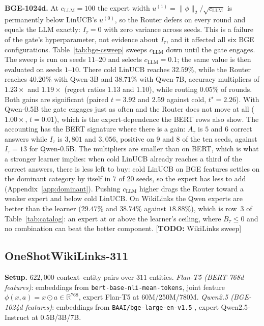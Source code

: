 \documentclass{article}
\theoremstyle{definition}
\theoremstyle{remark}
\theoremstyle{remark}
\newcommand{\todo}[1]{\textcolor{red!70!black}{[\textbf{TODO:} #1]}}
\begin{document}
\textbf{BGE-1024d.} At $c_{\mathrm{LLM}}=100$ the expert width $u^{(1)}=\|\phi\|_2/\sqrt{c_{\mathrm{LLM}}}$
is permanently below LinUCB's $u^{(0)}$, so the Router defers on every round
and equals the LLM exactly: $I_\tau=0$ with zero variance across seeds. This
is a failure of the gate's hyperparameter, not evidence about $I_\tau$, and it
affected all six BGE configurations. Table~\ref{tab:bge-csweep} sweeps $c_{\mathrm{LLM}}$
down until the gate engages. The sweep is run on seeds $11$--$20$ and selects
$c_{\mathrm{LLM}}=0.1$; the same value is then evaluated on seeds $1$--$10$. There cold LinUCB
reaches $32.59\%$, while the Router reaches $40.20\%$ with Qwen-3B and
$38.71\%$ with Qwen-7B, accuracy multipliers of $1.23\times$ and $1.19\times$
(regret ratios $1.13$ and $1.10$), while routing $0.05\%$ of rounds. Both gains
are significant (paired $t=3.92$ and $2.59$ against cold, $t^\star=2.26$). With
Qwen-0.5B the gate engages just as often and the Router does not move at all
($1.00\times$, $t=0.01$), which is the expert-dependence the BERT rows also
show. The accounting has the BERT signature where there is a gain: $A_\tau$ is
$5$ and $6$ correct answers while $I_\tau$ is $3{,}801$ and $3{,}056$, positive
on $9$ and $8$ of the ten seeds, against $I_\tau=13$ for Qwen-0.5B. The
multipliers are smaller than on BERT, which is what a stronger learner implies:
when cold LinUCB already reaches a third of the correct answers, there is less
left to buy: cold LinUCB on BGE features settles on the dominant category
by itself in $7$ of $20$ seeds, so the expert has less to add
(Appendix~\ref{app:dominant}). Pushing $c_{\mathrm{LLM}}$ higher
drags the Router toward a weaker expert and below cold LinUCB. On WikiLinks
the Qwen experts are better than the learner ($29.47\%$ and $38.74\%$ against
$18.88\%$), which is row~3 of Table~\ref{tab:catalog}: an expert at or above the
learner's ceiling, where $B_\tau\le0$ and no combination can beat the better
component. \todo{WikiLinks sweep}

\subsection{OneShotWikiLinks-311}
\label{app:wiki}

\textbf{Setup.} $622{,}000$ context--entity pairs over $311$ entities.
\emph{Flan-T5 (BERT-768d features)}: embeddings from
\texttt{bert-base-nli-mean-tokens}, joint feature $\phi(x,a)=x\odot a\in\mathbb R^{768}$,
expert Flan-T5 \cite{chung2024scaling} at 60M/250M/780M.
\emph{Qwen2.5 (BGE-1024d features)}: embeddings from
\texttt{BAAI/bge-large-en-v1.5} \cite{xiao2024c}, expert Qwen2.5-Instruct
\cite{hui2024qwen2} at 0.5B/3B/7B.
\end{document}

